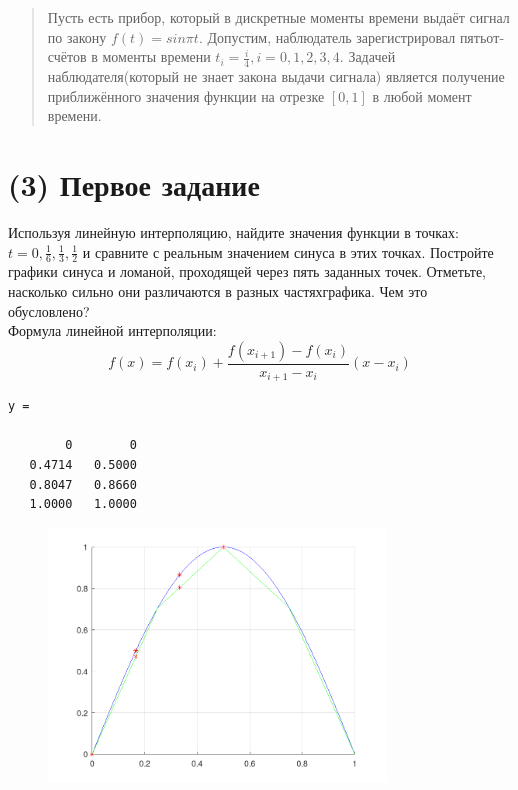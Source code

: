 \maketitle
\tableofcontents
\newpage

\begin{otherlanguage}{russian}
  \begin{abstract}
    Пусть есть прибор, который в дискретные моменты времени выдаёт сигнал по закону $f(t) = sin \pi t$. Допустим, наблюдатель зарегистрировал пятьотсчётов в моменты времени $t_{i} = \frac{i}{4}, i = 0, 1, 2, 3, 4$. Задачей наблюдателя(который не знает закона выдачи сигнала) является получение приближённого значения функции на отрезке $[0, 1]$ в любой момент времени.
  \end{abstract}
\end{otherlanguage}

\section{(3) Первое задание}

Используя линейную интерполяцию, найдите значения функции в точках: $t = 0, \frac{1}{6}, \frac{1}{3}, \frac{1}{2}$ и сравните с реальным значением синуса в этих точках. Постройте графики синуса и ломаной, проходящей через пять заданных точек. Отметьте, насколько сильно они различаются в разных частяхграфика. Чем это обусловлено?\\[5mm]

Формула линейной интерполяции:
\[
  f(x) = f(x_{i}) + \frac{f(x_{i+1}) - f(x_{i})}{x_{i+1} - x_{i}}(x - x_{i})
\]


\begin{lstlisting}[backgroundcolor=\color{cyan}]
  y =

        0        0
   0.4714   0.5000
   0.8047   0.8660
   1.0000   1.0000
 \end{lstlisting}

\begin{figure}[h]
  \centering
  \includegraphics[width=0.8\textwidth]{images/first_task_1.png}
\end{figure}

